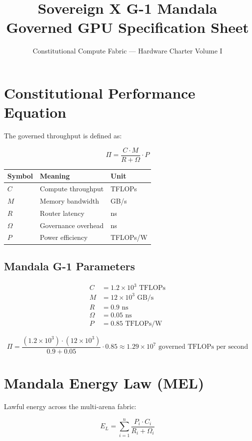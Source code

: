 \documentclass[10pt,a4paper]{article}
\title{Sovereign X G-1 Mandala \\ Governed GPU Specification Sheet}
\author{Constitutional Compute Fabric — Hardware Charter Volume I}
\date{}
\begin{document}
\maketitle

\section{Constitutional Performance Equation}

The governed throughput is defined as:

\[
\Pi = \frac{C \cdot M}{R + \Omega} \cdot P
\]

\begin{center}
\begin{tabular}{lll}
\toprule
Symbol & Meaning & Unit \\
\midrule
\(C\) & Compute throughput & TFLOPs \\
\(M\) & Memory bandwidth & GB/s \\
\(R\) & Router latency & ns \\
\(\Omega\) & Governance overhead & ns \\
\(P\) & Power efficiency & TFLOPs/W \\
\bottomrule
\end{tabular}
\end{center}

\subsection{Mandala G-1 Parameters}

\[
\begin{aligned}
C &= 1.2 \times 10^{3} \text{ TFLOPs} \\
M &= 12 \times 10^{3} \text{ GB/s} \\
R &= 0.9 \text{ ns} \\
\Omega &= 0.05 \text{ ns} \\
P &= 0.85 \text{ TFLOPs/W}
\end{aligned}
\]

\[
\Pi = \frac{(1.2 \times 10^{3}) \cdot (12 \times 10^{3})}{0.9 + 0.05} \cdot 0.85
\approx 1.29 \times 10^{7} \text{ governed TFLOPs per second}
\]

\section{Mandala Energy Law (MEL)}

Lawful energy across the multi-arena fabric:

\[
E_L = \sum_{i=1}^{n} \frac{P_i \cdot C_i}{R_i + \Omega_i}
\]
\end{document}
